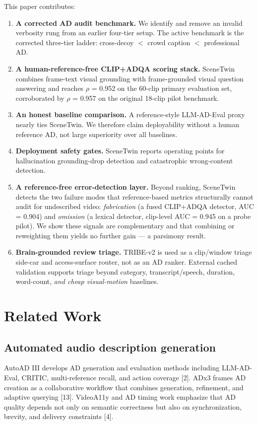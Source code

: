 \documentclass[10pt,twocolumn]{article}
\begin{document}
This paper contributes:


\begin{enumerate}[leftmargin=*]
\item \textbf{A corrected AD audit benchmark.} We identify and remove an invalid verbosity rung from an earlier four-tier setup. The active benchmark is the corrected three-tier ladder: cross-decoy $<$ crowd caption $<$ professional AD.
\item \textbf{A human-reference-free CLIP+ADQA scoring stack.} SceneTwin combines frame-text visual grounding with frame-grounded visual question answering and reaches $\rho$ = 0.952 on the 60-clip primary evaluation set, corroborated by $\rho$ = 0.957 on the original 18-clip pilot benchmark.
\item \textbf{An honest baseline comparison.} A reference-style LLM-AD-Eval proxy nearly ties SceneTwin. We therefore claim deployability without a human reference AD, not large superiority over all baselines.
\item \textbf{Deployment safety gates.} SceneTwin reports operating points for hallucination grounding-drop detection and catastrophic wrong-content detection.
\item \textbf{A reference-free error-detection layer.} Beyond ranking, SceneTwin detects the two failure modes that reference-based metrics structurally cannot audit for undescribed video: \emph{fabrication} (a fused CLIP+ADQA detector, AUC = 0.904) and \emph{omission} (a lexical detector, clip-level AUC = 0.945 on a probe pilot). We show these signals are complementary and that combining or reweighting them yields no further gain --- a parsimony result.
\item \textbf{Brain-grounded review triage.} TRIBE-v2 is used as a clip/window triage side-car and access-surface router, not as an AD ranker. External cached validation supports triage beyond category, transcript/speech, duration, word-count, \emph{and cheap visual-motion} baselines.
\end{enumerate}

\section{Related Work}


\subsection{Automated audio description generation}

AutoAD III develops AD generation and evaluation methods including LLM-AD-Eval, CRITIC, multi-reference recall, and action coverage [2]. ADx3 frames AD creation as a collaborative workflow that combines generation, refinement, and adaptive querying [13]. VideoA11y and AD timing work emphasize that AD quality depends not only on semantic correctness but also on synchronization, brevity, and delivery constraints [4].
\end{document}
